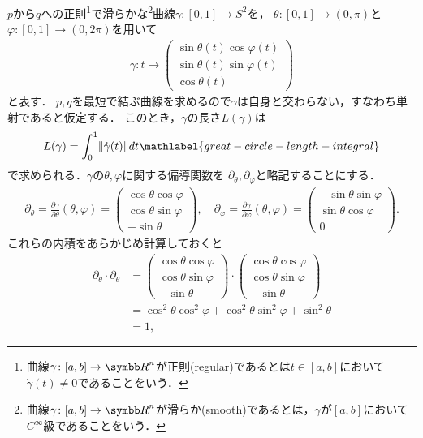 \documentclass{ltjsbook}
\begin{document}
\(p\)から\(q\)への正則\footnote{%
曲線\(\gamma\colon [a, b] \to {\Real}^n\)が正則(regular)であるとは\(t \in [a, b]\)において\(\dot{\gamma}(t) \neq 0\)であることをいう．
}で滑らかな\footnote{%
曲線\(\gamma\colon [a, b] \to {\Real}^n\)が滑らか(smooth)であるとは，\(\gamma\)が\([a, b]\)において\(C^\infty\)級であることをいう．
}曲線\(\gamma \colon [0, 1] \to S^2\)を，
\(\theta \colon [0, 1] \to (0, \pi)\)と\(\varphi\colon [0, 1] \to (0, 2\pi)\)を用いて
\begin{align*}
    \gamma \colon t \mapsto
        \begin{pmatrix}
            \sin \theta(t) \cos \varphi(t) \\
            \sin \theta(t) \sin \varphi(t) \\
            \cos \theta(t)
        \end{pmatrix}
\end{align*}
と表す．
\(p, q\)を最短で結ぶ曲線を求めるので\(\gamma\)は自身と交わらない，すなわち単射であると仮定する．
このとき，\(\gamma\)の長さ\(L(\gamma)\)は
\begin{align}
    L(\gamma) = \int_{0}^{1} \lVert \dot{\gamma}(t) \rVert  dt
    \mathlabel{great-circle-length-integral}
\end{align}
で求められる．\(\gamma\)の\(\theta, \varphi\)に関する偏導関数を
\(\partial_\theta, \partial_\varphi\)と略記することにする．
\begin{align*}
    \partial_\theta
    = \frac{\partial \gamma}{\partial \theta}(\theta, \varphi)
    =
    \begin{pmatrix}
        \cos \theta \cos \varphi \\
        \cos \theta \sin \varphi \\
        - \sin \theta
    \end{pmatrix},
    \quad
    \partial_\varphi
    = \frac{\partial \gamma}{\partial \varphi}(\theta, \varphi)
    =
    \begin{pmatrix}
        - \sin \theta \sin \varphi \\
        \sin \theta \cos \varphi \\
        0
    \end{pmatrix}.
\end{align*}
これらの内積をあらかじめ計算しておくと
\begin{align*}
    \partial_\theta \cdot \partial_\theta
    &=
    \begin{pmatrix}
        \cos \theta \cos \varphi \\
        \cos \theta \sin \varphi \\
        - \sin \theta
    \end{pmatrix}
    \cdot
    \begin{pmatrix}
        \cos \theta \cos \varphi \\
        \cos \theta \sin \varphi \\
        - \sin \theta
    \end{pmatrix} \\
    &= \cos^2 \theta \cos^2 \varphi
        + \cos^2 \theta \sin^2 \varphi
        + \sin^2 \theta \\
    &= 1,
\end{align*}
\end{document}
